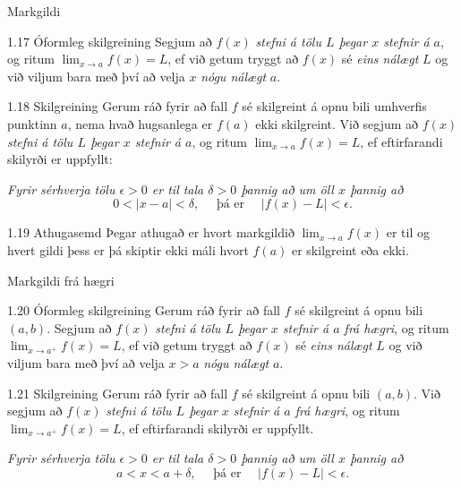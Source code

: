 \documentclass[icelandic,a4paper,12pt]{article}
\begin{document}
\begin{frame}{Markgildi}
\begin{block}{1.17 Óformleg skilgreining}  
Segjum að  $f(x)$
{\it stefni á tölu $L$ þegar $x$ stefnir á $a$}, og ritum
$\lim_{x\rightarrow a} f(x)=L$, ef við getum tryggt að  $f(x)$ sé {\em
  eins nálægt}
$L$ og við viljum bara með því að velja $x$ {\em nógu nálægt} $a$.  
\end{block}

\pause

\begin{block}{1.18 Skilgreining} Gerum ráð fyrir að fall $f$ sé
skilgreint á opnu bili umhverfis punktinn $a$, nema hvað hugsanlega er
$f(a)$ ekki skilgreint. \pause 
Við segjum að $f(x)$
\emph{stefni á tölu $L$ þegar $x$ stefnir á $a$}, og ritum
$\lim_{x\rightarrow a} f(x)=L$, ef eftirfarandi skilyrði er uppfyllt:

\emph{Fyrir sérhverja tölu $\epsilon>0$ er til tala $\delta>0$ 
þannig að um öll $x$ þannig að}
$$
0<|x-a|<\delta,\quad \text{ þá er } \quad |f(x)-L|<\epsilon.
$$
\end{block}

\pause

\begin{block}{1.19 Athugasemd}  Þegar athugað er hvort markgildið
$\lim_{x\rightarrow a} f(x)$ er til og hvert gildi þess er þá skiptir
ekki máli hvort $f(a)$ er skilgreint eða ekki.
\end{block}
\end{frame}

\begin{frame}{Markgildi frá hægri}
\begin{block}{1.20 Óformleg skilgreining}   
Gerum ráð fyrir að fall $f$ sé
skilgreint á opnu bili $(a,b)$.  Segjum að  $f(x)$
{\it stefni á tölu $L$ þegar $x$ stefnir á $a$ frá hægri}, og ritum
$\lim_{x\rightarrow a^+} f(x)=L$, ef við getum tryggt að  $f(x)$ sé 
{\em eins nálægt}
$L$ og við viljum bara með því að velja $x>a$ {\em nógu nálægt} $a$. 
\end{block}

\pause

\begin{block}{1.21 Skilgreining} Gerum ráð fyrir að fall $f$ sé
skilgreint á opnu bili $(a,b)$.  Við segjum að $f(x)$
{\it stefni á tölu $L$ þegar $x$ stefnir á $a$ frá hægri}, og ritum
$\lim_{x\rightarrow a^+} f(x)=L$, ef eftirfarandi skilyrði er uppfyllt.

{\it Fyrir sérhverja tölu $\epsilon>0$ er til tala $\delta>0$ þannig
  að um öll $x$ þannig að} 
$$
a<x<a+\delta,\quad \text{ þá er } \quad |f(x)-L|<\epsilon.
$$
\end{block}
\end{frame}
\end{document}
